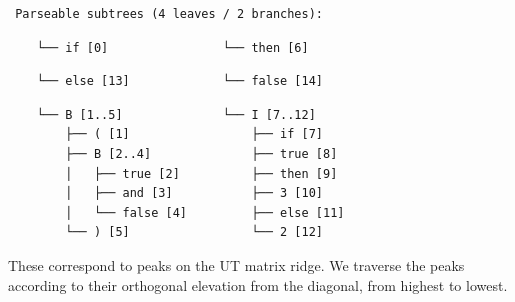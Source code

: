 \documentclass[sigplan,nonacm]{acmart}\settopmatter{printfolios=false,printccs=false,printacmref=false}
\begin{document}
\begin{verbatim}
 Parseable subtrees (4 leaves / 2 branches):
\end{verbatim}
\hspace{0.6cm}\hspace{4cm}
\begin{verbatim}
    └── if [0]                └── then [6]
\end{verbatim}
\hspace{0.6cm}\hspace{4cm}
\begin{verbatim}
    └── else [13]             └── false [14]
\end{verbatim}
\hspace{0.6cm}\hspace{4cm}
\begin{verbatim}
    └── B [1..5]              └── I [7..12]
        ├── ( [1]                 ├── if [7]
        ├── B [2..4]              ├── true [8]
        │   ├── true [2]          ├── then [9]
        │   ├── and [3]           ├── 3 [10]
        │   └── false [4]         ├── else [11]
        └── ) [5]                 └── 2 [12]
\end{verbatim}

These correspond to peaks on the UT matrix ridge. We traverse the peaks according to their orthogonal elevation from the diagonal, from highest to lowest.

\newcommand\ddd{\Ddots}
\newcommand\vdd{\Vdots}
\newcommand\cdd{\Cdots}
\newcommand\lds{\ldots}
\newcommand\vno{\varnothing}
\newcommand{\ts}[1]{\textsuperscript{#1}}
\newcommand\non{1\ts{st}}
\newcommand\ntw{2\ts{nd}}
\newcommand\nth{3\ts{rd}}
\newcommand\nfo{4\ts{th}}
\newcommand\nfi{5\ts{th}}
\newcommand\nsi{6\ts{th}}
\newcommand\nse{7\ts{th}}
\newcommand\pcd{\cdot}
\newcommand\ppp{\phantom{\nse}}
\end{document}
